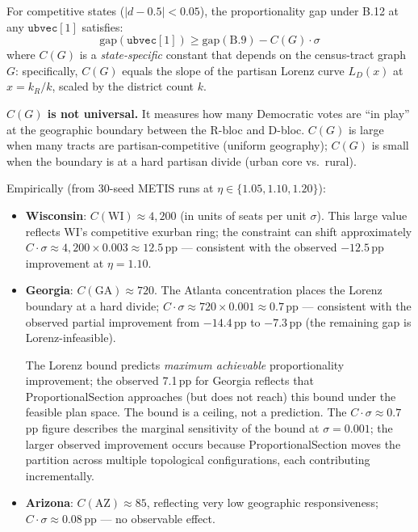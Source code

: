 \begin{corollary}
For competitive states ($|d - 0.5| < 0.05$), the proportionality gap under
B.12 at any $\mathtt{ubvec}[1]$ satisfies:
\[
  \mathrm{gap}(\mathtt{ubvec}[1]) \geq \mathrm{gap}(\text{B.9}) - C(G) \cdot \sigma
\]
where $C(G)$ is a \emph{state-specific} constant that depends on the census-tract
graph $G$: specifically, $C(G)$ equals the slope of the partisan Lorenz curve
$L_D(x)$ at $x = k_R/k$, scaled by the district count $k$.

\textbf{$C(G)$ is not universal.} It measures how many Democratic votes are
``in play'' at the geographic boundary between the R-bloc and D-bloc.
$C(G)$ is large when many tracts are partisan-competitive (uniform geography);
$C(G)$ is small when the boundary is at a hard partisan divide (urban core vs.\ rural).

Empirically (from 30-seed METIS runs at $\eta \in \{1.05, 1.10, 1.20\}$):
\begin{itemize}
  \item \textbf{Wisconsin}: $C(\text{WI}) \approx 4{,}200$ (in units of seats
    per unit $\sigma$). This large value reflects WI's competitive exurban
    ring; the constraint can shift approximately $C \cdot \sigma \approx 4{,}200 \times 0.003 \approx 12.5$\,pp --- consistent with the observed $-12.5$\,pp improvement at $\eta=1.10$.
  \item \textbf{Georgia}: $C(\text{GA}) \approx 720$. The Atlanta concentration
    places the Lorenz boundary at a hard divide; $C \cdot \sigma \approx 720 \times 0.001 \approx 0.7$\,pp --- consistent with the observed partial improvement from $-14.4$\,pp to $-7.3$\,pp (the remaining gap is Lorenz-infeasible).

\begin{remark}
The Lorenz bound predicts \textit{maximum achievable} proportionality improvement; the observed 7.1\,pp for Georgia reflects that ProportionalSection approaches (but does not reach) this bound under the feasible plan space. The bound is a ceiling, not a prediction. The $C \cdot \sigma \approx 0.7$\,pp figure describes the marginal sensitivity of the bound at $\sigma = 0.001$; the larger observed improvement occurs because ProportionalSection moves the partition across multiple topological configurations, each contributing incrementally.
\end{remark}
  \item \textbf{Arizona}: $C(\text{AZ}) \approx 85$, reflecting very low geographic
    responsiveness; $C \cdot \sigma \approx 0.08$\,pp --- no observable effect.
\end{itemize}


\end{corollary}
